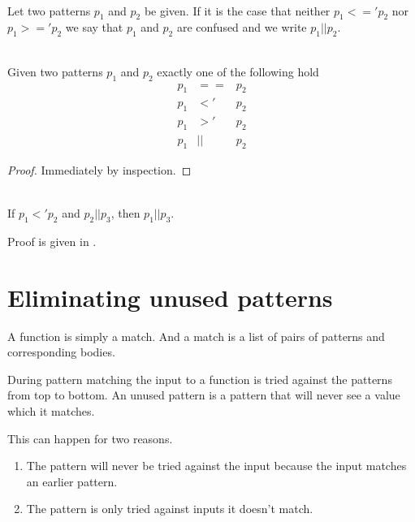 \begin{definition}[Confusion, $||$]\
  \label{def:pat-confusion}\\
  Let two patterns $p_1$ and $p_2$ be given. If it is the case that neither $p_1
  <=' p_2$ nor $p_1 >=' p_2$ we say that $p_1$ and $p_2$ are confused and we
  write $p_1 || p_2$.
\end{definition}

\begin{lemma}\
  \label{lem:unique-rel}\\
  Given two patterns $p_1$ and $p_2$ exactly one of the following hold
  \begin{eqnarray*}
    p_1 &==& p_2\\
    p_1 &<'& p_2\\
    p_1 &>'& p_2\\
    p_1 &||& p_2
  \end{eqnarray*}
\end{lemma}
\begin{proof}
  Immediately by inspection.
\end{proof}

\begin{lemma}[]\
  \label{lem:more-specific-confused}\\
  If $p_1 <' p_2$ and $p_2 || p_3$, then $p_1 || p_3$.

  Proof is given in .
\end{lemma}


\section{Eliminating unused patterns}
A function is simply a match. And a match is a list of pairs of patterns and
corresponding bodies.

During pattern matching the input to a function is tried against the patterns
from top to bottom. An unused pattern is a pattern that will never see a value
which it matches.

This can happen for two reasons.
\begin{enumerate}
\item The pattern will never be tried against the input because the input
  matches an earlier pattern\label{item:unused-reason-1}.
\item The pattern is only tried against inputs it doesn't
  match\label{item:unused-reason-2}.
\end{enumerate}

